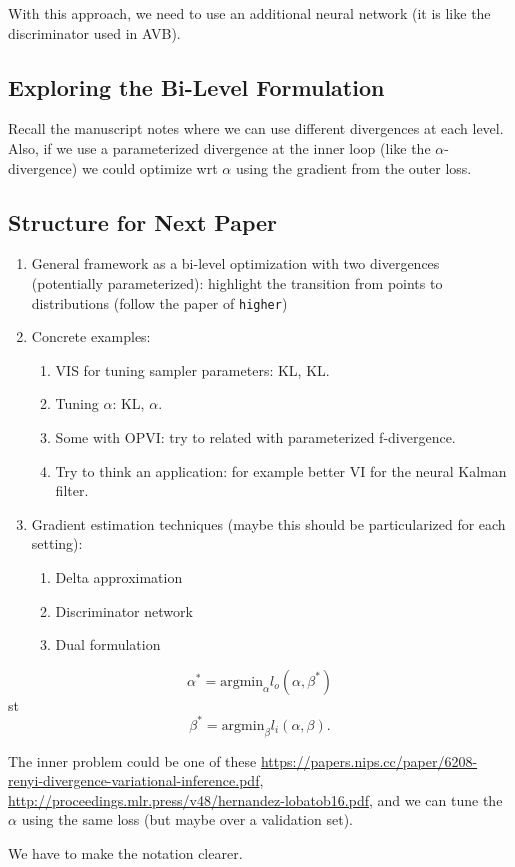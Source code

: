 With this approach, we need to use an additional neural network (it is like the discriminator used in AVB).


\subsection{Exploring the Bi-Level Formulation}

Recall the manuscript notes where we can use different divergences at each level.
Also, if we use a parameterized divergence at the inner loop (like the $\alpha$-divergence) we could optimize wrt $\alpha$ using the gradient from the outer loss.

\subsection{Structure for Next Paper}

\begin{enumerate}
    \item General framework as a bi-level optimization with two divergences (potentially parameterized): highlight the transition from points to distributions (follow the paper of \texttt{higher})
    \item Concrete examples:
    \begin{enumerate}
        \item VIS for tuning sampler parameters: KL, KL.
        \item Tuning $\alpha$: KL, $\alpha$.
        \item Some with OPVI: try to related with parameterized f-divergence.
        \item Try to think an application: for example better VI for the neural Kalman filter.
    \end{enumerate}
    \item Gradient estimation techniques (maybe this should be particularized for each setting):
    \begin{enumerate}
        \item Delta approximation
        \item Discriminator network
        \item Dual formulation
    \end{enumerate}
\end{enumerate}


$$
\alpha^* = \mbox{argmin}_{\alpha} l_o(\alpha, \beta^*)
$$
st
$$
\beta^* = \mbox{argmin}_{\beta} l_i(\alpha, \beta).
$$

The inner problem could be one of these \url{https://papers.nips.cc/paper/6208-renyi-divergence-variational-inference.pdf}, \url{http://proceedings.mlr.press/v48/hernandez-lobatob16.pdf}, and we can tune the $\alpha$ using the same loss (but maybe over a validation set).

We have to make the notation clearer.
\fi